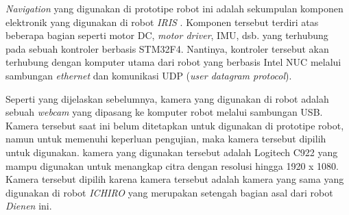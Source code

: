 \emph{Navigation} yang digunakan di prototipe robot ini adalah sekumpulan komponen elektronik yang digunakan di robot \emph{IRIS} \citep{cit:dikairono2020}.
Komponen tersebut terdiri atas beberapa bagian seperti motor DC, \emph{motor driver}, IMU, dsb. yang terhubung pada sebuah kontroler berbasis STM32F4.
Nantinya, kontroler tersebut akan terhubung dengan komputer utama dari robot yang berbasis Intel NUC melalui sambungan \emph{ethernet} dan komunikasi UDP (\emph{user datagram protocol}).

Seperti yang dijelaskan sebelumnya, kamera yang digunakan di robot adalah sebuah \emph{webcam} yang dipasang ke komputer robot melalui sambungan USB.
Kamera tersebut saat ini belum ditetapkan untuk digunakan di prototipe robot,
  namun untuk memenuhi keperluan pengujian, maka kamera tersebut dipilih untuk digunakan.
kamera yang digunakan tersebut adalah Logitech C922 yang mampu digunakan untuk menangkap citra dengan resolusi hingga 1920 x 1080.
Kamera tersebut dipilih karena kamera tersebut adalah kamera yang sama yang digunakan di robot \emph{ICHIRO} \citep{cit:muhtadin2019} yang merupakan setengah bagian asal dari robot \emph{Dienen} ini.

